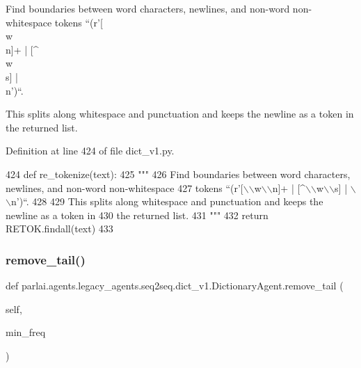 \begin{DoxyVerb}Find boundaries between word characters, newlines, and non-word non-whitespace
tokens ``(r'[\\w\\n]+ | [^\\w\\s] | \\n')``.

This splits along whitespace and punctuation and keeps the newline as a token in
the returned list.
\end{DoxyVerb}
 

Definition at line 424 of file dict\+\_\+v1.\+py.


\begin{DoxyCode}
424     \textcolor{keyword}{def }re\_tokenize(text):
425         \textcolor{stringliteral}{"""}
426 \textcolor{stringliteral}{        Find boundaries between word characters, newlines, and non-word non-whitespace}
427 \textcolor{stringliteral}{        tokens ``(r'[\(\backslash\)\(\backslash\)w\(\backslash\)\(\backslash\)n]+ | [^\(\backslash\)\(\backslash\)w\(\backslash\)\(\backslash\)s] | \(\backslash\)\(\backslash\)n')``.}
428 \textcolor{stringliteral}{}
429 \textcolor{stringliteral}{        This splits along whitespace and punctuation and keeps the newline as a token in}
430 \textcolor{stringliteral}{        the returned list.}
431 \textcolor{stringliteral}{        """}
432         \textcolor{keywordflow}{return} RETOK.findall(text)
433 
\end{DoxyCode}
\mbox{\label{classparlai_1_1agents_1_1legacy__agents_1_1seq2seq_1_1dict__v1_1_1DictionaryAgent_a77b3d40dd63f7ab22bfc947b343339c7}} 
\subsubsection{\texorpdfstring{remove\+\_\+tail()}{remove\_tail()}}
{\footnotesize\ttfamily def parlai.\+agents.\+legacy\+\_\+agents.\+seq2seq.\+dict\+\_\+v1.\+Dictionary\+Agent.\+remove\+\_\+tail (\begin{DoxyParamCaption}\item[{}]{self,  }\item[{}]{min\+\_\+freq }\end{DoxyParamCaption})}

